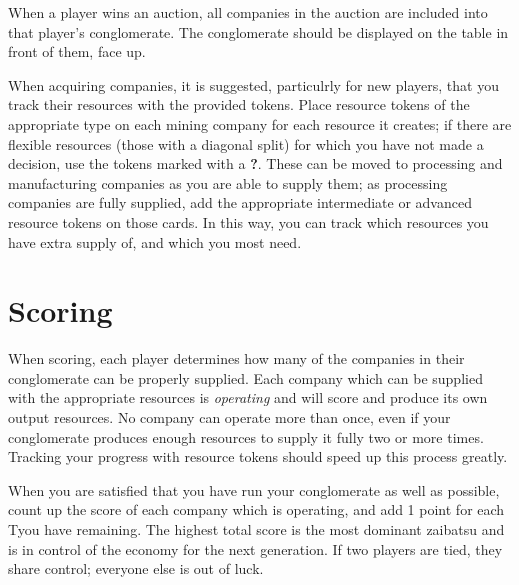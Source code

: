 \documentclass[]{article}
\newcommand{\tyen}{T\textyen}
\begin{document}
When a player wins an auction, all companies in the auction are included into
that player's conglomerate. The conglomerate should be displayed on the table in
front of them, face up. 

When acquiring companies, it is suggested, particulrly for new players, that you
track their resources with the provided tokens. Place resource tokens of the
appropriate type on each mining company for each resource it creates; if there
are flexible resources (those with a diagonal split) for which you have not made
a decision, use the tokens marked with a \textbf{?}. These can be moved to
processing and manufacturing companies as you are able to supply them; as
processing companies are fully supplied, add the appropriate intermediate or
advanced resource tokens on those cards. In this way, you can track which
resources you have extra supply of, and which you most need.

\section*{Scoring}

When scoring, each player determines how many of the companies in their
conglomerate can be properly supplied. Each company which can be supplied with
the appropriate resources is \emph{operating} and will score and produce its own
output resources. No company can operate more than once, even if your
conglomerate produces enough resources to supply it fully two or more times.
Tracking your progress with resource tokens should speed up this process
greatly.


When you are satisfied that you have run your conglomerate as well as possible,
count up the score of each company which is operating, and add 1 point for each
\tyen you have remaining. The highest total score is the most dominant zaibatsu
and is in control of the economy for the next generation. If two players are
tied, they share control; everyone else is out of luck.
\end{document}
